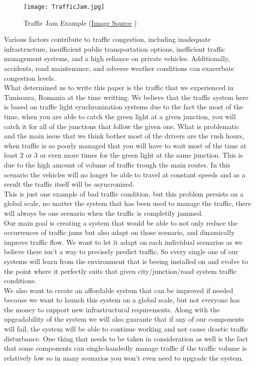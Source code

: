 \documentclass[17pt]{report}
\begin{document}
\begin{figure}[h!]
    \texttt{[image: TrafficJam.jpg]}
    \caption{Traffic Jam Example 
    (\href{https://unsplash.com/photos/cekJ1XXx1Rk}{Image Source} \textcopyright)}
    \label{fig:TrafficJam}
\end{figure}


Various factors contribute to traffic congestion, including
inadequate infrastructure, insufficient public transportation options,
inefficient traffic management systems, and a high reliance on private
vehicles. Additionally, accidents, road maintenance, and adverse
weather conditions can exacerbate congestion levels. \\
\indent 
What determined us to  write this paper is the traffic that we 
experienced in Timisoara, Romania at the time writting. We believe that
the traffic system here is based on traffic light synchronization systems 
due to the fact the most of the time, when you are able to catch the 
green light at a given junction, you will catch it for all of the junctions 
that follow the given one. What is problematic and the main issue that 
we think bother most of the drivers are the rush hours, when traffic 
is so poorly managed that you will have to wait most of the time at least 
2 or 3 or even more times for the green light at the same junction. This 
is due to the high amount of volume of traffic trough the main routes. In 
this scenario the vehicles will no longer be able to travel at constant 
speeds and as a result the traffic itself will be asyncronized. \\
\indent
This is just one example of bad traffic condition, but this problem 
persists on a global scale, no matter the system that has been used to 
manage the traffic, there will always be one scenario when the traffic 
is completily jammed. \\
\indent
Our main goal is creating a system that would be able to not only reduce 
the occurrences of traffic jams but also adapt on those scenario, and 
dinamically improve traffic flow. We want to let it adapt on each 
individual scenarios as we believe there isn't a way to precisely 
predict traffic. So every single one of our systems will learn from 
the environment that is beeing installed on and evolve to the point 
where it perfectly suits that given city/junction/road system 
traffic conditions. \\
\indent 
We also want to create an affordable system that can be improved if 
needed because we want to launch this system on a global scale, but not 
everyone has the money to support new infrastructural requirements. 
Along with the upgradability of the system we will also guarante that 
if any of our components will fail, the system will be able to continue
working and not cause drastic traffic disturbance. One thing that needs
to be taken in consideration as well is the fact that some components 
can single-handedly manage traffic if the traffic volume is relatively 
low so in many scenarios you won't even need to upgrade the system.
\end{document}

